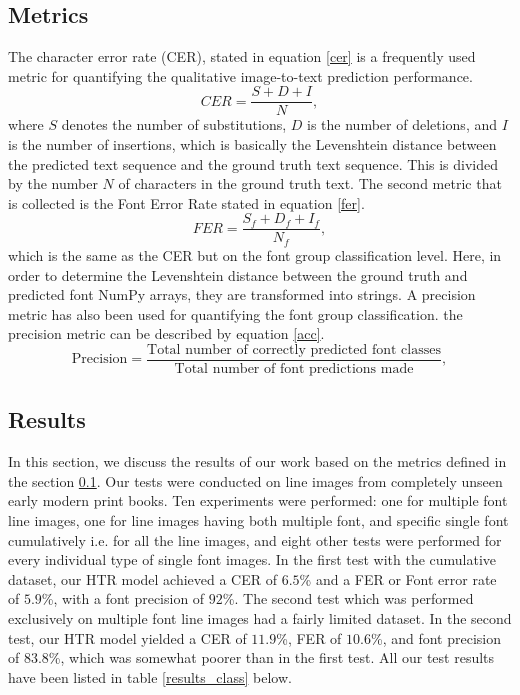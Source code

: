 \documentclass[conference]{IEEEtran}
\begin{document}
\subsection{Metrics}\label{metrics}
The character error rate (CER), stated in equation \ref{cer} is a frequently used metric for quantifying the qualitative image-to-text prediction performance.
\begin{equation}\label{cer}
CER=\frac{S+D+I}{N}, \tag{10}
\end{equation}
where $S$ denotes the number of substitutions, $D$ is the number of deletions, and $I$ is the number of insertions, which is basically the Levenshtein distance between the predicted text sequence and the ground truth text sequence. This is divided by the number $N$ of characters in the ground truth text.\newline 
The second metric that is collected is the Font Error Rate stated in equation \ref{fer}.
\begin{equation}\label{fer}
FER=\frac{S_f+D_f+I_f}{N_f}, \tag{11}
\end{equation}
which is the same as the CER but on the font group classification level. Here, in order to determine the Levenshtein distance between the ground truth and predicted font NumPy arrays, they are transformed into strings.
A precision metric has also been used for quantifying the font group classification. the precision metric can be described by equation \ref{acc}.
\begin{equation}\label{acc}
\text{Precision} = \frac{\text{Total number of correctly predicted font classes}}{\text{Total number of font predictions made}}, \tag{12}
\end{equation}

\subsection{Results}\label{results}
In this section, we discuss the results of our work based on the metrics defined in the section \ref{metrics}. \newline
Our tests were conducted on line images from completely unseen early modern print books. Ten experiments were performed: one for multiple font line images, one for line images having both multiple font, and specific single font cumulatively i.e. for all the line images, and eight other tests were performed for every individual type of single font images. In the first test with the cumulative dataset, our HTR model achieved a CER of $6.5$\% and a FER or Font error rate of $5.9$\%, with a font precision of $92$\%. The second test which was performed exclusively on multiple font line images had a fairly limited dataset. In the second test, our HTR model yielded a CER of $11.9$\%, FER of $10.6$\%, and font precision of $83.8$\%, which was somewhat poorer than in the first test. All our test results have been listed in table \ref{results_class} below.
\end{document}
